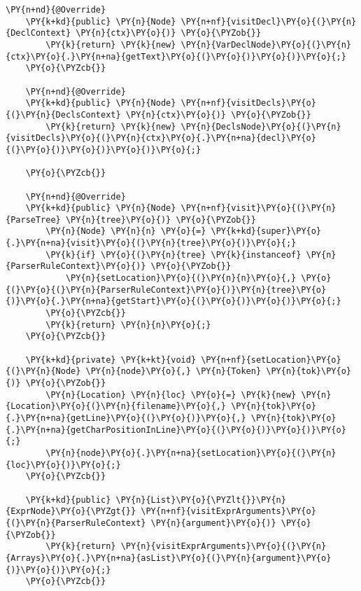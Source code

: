 \begin{Verbatim}[commandchars=\\\{\}]
    \PY{n+nd}{@Override}
    \PY{k+kd}{public} \PY{n}{Node} \PY{n+nf}{visitDecl}\PY{o}{(}\PY{n}{DeclContext} \PY{n}{ctx}\PY{o}{)} \PY{o}{\PYZob{}}
        \PY{k}{return} \PY{k}{new} \PY{n}{VarDeclNode}\PY{o}{(}\PY{n}{ctx}\PY{o}{.}\PY{n+na}{getText}\PY{o}{(}\PY{o}{)}\PY{o}{)}\PY{o}{;}
    \PY{o}{\PYZcb{}}
    
    \PY{n+nd}{@Override}
    \PY{k+kd}{public} \PY{n}{Node} \PY{n+nf}{visitDecls}\PY{o}{(}\PY{n}{DeclsContext} \PY{n}{ctx}\PY{o}{)} \PY{o}{\PYZob{}}
        \PY{k}{return} \PY{k}{new} \PY{n}{DeclsNode}\PY{o}{(}\PY{n}{visitDecls}\PY{o}{(}\PY{n}{ctx}\PY{o}{.}\PY{n+na}{decl}\PY{o}{(}\PY{o}{)}\PY{o}{)}\PY{o}{)}\PY{o}{;}
        
    \PY{o}{\PYZcb{}}

    \PY{n+nd}{@Override}
    \PY{k+kd}{public} \PY{n}{Node} \PY{n+nf}{visit}\PY{o}{(}\PY{n}{ParseTree} \PY{n}{tree}\PY{o}{)} \PY{o}{\PYZob{}}
        \PY{n}{Node} \PY{n}{n} \PY{o}{=} \PY{k+kd}{super}\PY{o}{.}\PY{n+na}{visit}\PY{o}{(}\PY{n}{tree}\PY{o}{)}\PY{o}{;}
        \PY{k}{if} \PY{o}{(}\PY{n}{tree} \PY{k}{instanceof} \PY{n}{ParserRuleContext}\PY{o}{)} \PY{o}{\PYZob{}}
            \PY{n}{setLocation}\PY{o}{(}\PY{n}{n}\PY{o}{,} \PY{o}{(}\PY{o}{(}\PY{n}{ParserRuleContext}\PY{o}{)}\PY{n}{tree}\PY{o}{)}\PY{o}{.}\PY{n+na}{getStart}\PY{o}{(}\PY{o}{)}\PY{o}{)}\PY{o}{;}
        \PY{o}{\PYZcb{}}
        \PY{k}{return} \PY{n}{n}\PY{o}{;}
    \PY{o}{\PYZcb{}}
    
    \PY{k+kd}{private} \PY{k+kt}{void} \PY{n+nf}{setLocation}\PY{o}{(}\PY{n}{Node} \PY{n}{node}\PY{o}{,} \PY{n}{Token} \PY{n}{tok}\PY{o}{)} \PY{o}{\PYZob{}}
        \PY{n}{Location} \PY{n}{loc} \PY{o}{=} \PY{k}{new} \PY{n}{Location}\PY{o}{(}\PY{n}{filename}\PY{o}{,} \PY{n}{tok}\PY{o}{.}\PY{n+na}{getLine}\PY{o}{(}\PY{o}{)}\PY{o}{,} \PY{n}{tok}\PY{o}{.}\PY{n+na}{getCharPositionInLine}\PY{o}{(}\PY{o}{)}\PY{o}{)}\PY{o}{;}
        \PY{n}{node}\PY{o}{.}\PY{n+na}{setLocation}\PY{o}{(}\PY{n}{loc}\PY{o}{)}\PY{o}{;}
    \PY{o}{\PYZcb{}}

    \PY{k+kd}{public} \PY{n}{List}\PY{o}{\PYZlt{}}\PY{n}{ExprNode}\PY{o}{\PYZgt{}} \PY{n+nf}{visitExprArguments}\PY{o}{(}\PY{n}{ParserRuleContext} \PY{n}{argument}\PY{o}{)} \PY{o}{\PYZob{}}
        \PY{k}{return} \PY{n}{visitExprArguments}\PY{o}{(}\PY{n}{Arrays}\PY{o}{.}\PY{n+na}{asList}\PY{o}{(}\PY{n}{argument}\PY{o}{)}\PY{o}{)}\PY{o}{;}
    \PY{o}{\PYZcb{}}


\end{Verbatim}
